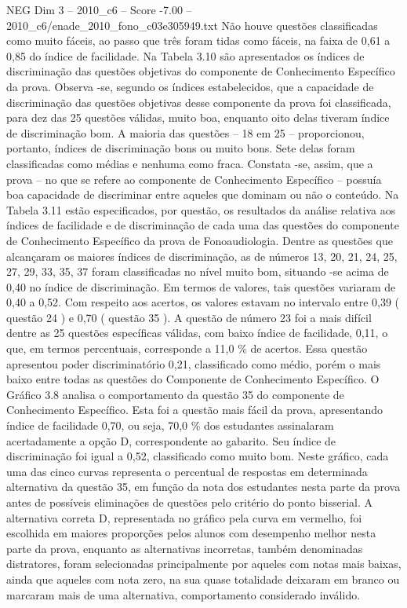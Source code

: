 \begin{textsample}{NEG Dim 3 – 2010\_c6 – Score -7.00 – 2010\_c6/enade\_2010\_fono\_c03e305949.txt}
Não houve questões classificadas como muito fáceis, ao passo que três foram tidas como fáceis, na faixa de 0,61 a 0,85 do índice de facilidade.
Na Tabela 3.10 são apresentados os índices de discriminação das questões objetivas do componente de Conhecimento Específico da prova.
Observa -se, segundo os índices estabelecidos, que a capacidade de discriminação das questões objetivas desse componente da prova foi classificada, para dez das 25 questões válidas, muito boa, enquanto oito delas tiveram índice de discriminação bom.
A maioria das questões – 18 em 25 – proporcionou, portanto, índices de discriminação bons ou muito bons.
Sete delas foram classificadas como médias e nenhuma como fraca.
Constata -se, assim, que a prova – no que se refere ao componente de Conhecimento Específico – possuía boa capacidade de discriminar entre aqueles que dominam ou não o conteúdo.
Na Tabela 3.11 estão especificados, por questão, os resultados da análise relativa aos índices de facilidade e de discriminação de cada uma das questões do componente de Conhecimento Específico da prova de Fonoaudiologia.
Dentre as questões que alcançaram os maiores índices de discriminação, as de números 13, 20, 21, 24, 25, 27, 29, 33, 35, 37 foram classificadas no nível muito bom, situando -se acima de 0,40 no índice de discriminação.
Em termos de valores, tais questões variaram de 0,40 a 0,52.
Com respeito aos acertos, os valores estavam no intervalo entre 0,39 ( questão 24 ) e 0,70 ( questão 35 ).
A questão de número 23 foi a mais difícil dentre as 25 questões específicas válidas, com baixo índice de facilidade, 0,11, o que, em termos percentuais, corresponde a 11,0 \% de acertos.
Essa questão apresentou poder discriminatório 0,21, classificado como médio, porém o mais baixo entre todas as questões do Componente de Conhecimento Específico.
O Gráfico 3.8 analisa o comportamento da questão 35 do componente de Conhecimento Específico.
Esta foi a questão mais fácil da prova, apresentando índice de facilidade 0,70, ou seja, 70,0 \% dos estudantes assinalaram acertadamente a opção D, correspondente ao gabarito.
Seu índice de discriminação foi igual a 0,52, classificado como muito bom.
Neste gráfico, cada uma das cinco curvas representa o percentual de respostas em determinada alternativa da questão 35, em função da nota dos estudantes nesta parte da prova antes de possíveis eliminações de questões pelo critério do ponto bisserial.
A alternativa correta D, representada no gráfico pela curva em vermelho, foi escolhida em maiores proporções pelos alunos com desempenho melhor nesta parte da prova, enquanto as alternativas incorretas, também denominadas distratores, foram selecionadas principalmente por aqueles com notas mais baixas, ainda que aqueles com nota zero, na sua quase totalidade deixaram em branco ou marcaram mais de uma alternativa, comportamento considerado inválido.

\end{textsample}
